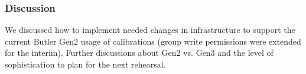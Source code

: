 \subsubsection{Discussion}
We discussed how to implement needed changes in infrastructure to support the current
Butler Gen2 usage of calibrations (group write permissions were extended for the
interim).  Further discussions about Gen2 vs. Gen3 and the level of sophistication
to plan for the next rehearsal.

